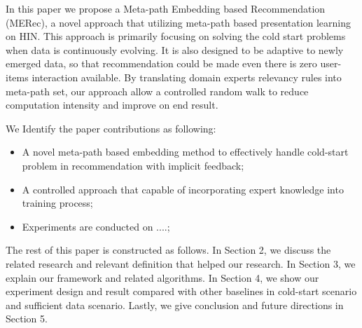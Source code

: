 In this paper we propose a Meta-path Embedding based Recommendation (MERec), a novel approach that utilizing meta-path based presentation learning on HIN. This approach is primarily focusing on solving the cold start problems when data is continuously evolving. It is also designed to be adaptive to newly emerged data, so that recommendation could be made even there is zero user-items interaction available. By translating domain experts relevancy rules into meta-path set, our approach allow a controlled random walk to reduce computation intensity and improve on end result. 

We Identify the paper contributions as following:
\begin{itemize}
    \item A novel meta-path based embedding method to effectively handle cold-start problem in recommendation with implicit feedback;
    \item A controlled approach that capable of incorporating expert knowledge into training process;
    \item Experiments are conducted on ....;
\end{itemize}

The rest of this paper is constructed as follows. In Section 2, we discuss the related research and relevant definition that helped our research. In Section 3, we explain our framework and related algorithms. In Section 4, we show our experiment design and result compared with other baselines in cold-start scenario and sufficient data scenario. Lastly, we give conclusion and future directions in Section 5.